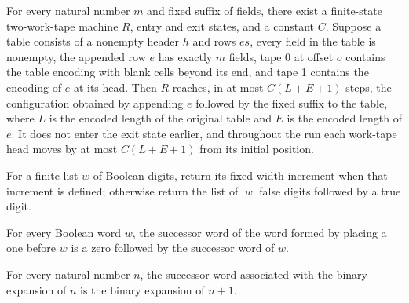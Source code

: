 \begin{theorem}
\label{Turing.exists_tableAppendTM}
\leanok
{}
For every natural number $m$ and fixed suffix of fields, there exist a finite-state
two-work-tape machine $R$, entry and exit states, and a constant $C$. Suppose a table
consists of a nonempty header $h$ and rows $es$, every field in the table is nonempty,
the appended row $e$ has exactly $m$ fields, tape 0 at offset $o$ contains the table
encoding with blank cells beyond its end, and tape 1 contains the encoding of $e$ at its
head. Then $R$ reaches, in at most $C(L+E+1)$ steps, the configuration obtained by
appending $e$ followed by the fixed suffix to the table, where $L$ is the encoded length
of the original table and $E$ is the encoded length of $e$. It does not enter the exit
state earlier, and throughout the run each work-tape head moves by at most $C(L+E+1)$
from its initial position.
\end{theorem}

\begin{definition}
\label{Turing.rt_succWord}
\leanok
{}
For a finite list $w$ of Boolean digits, return its fixed-width increment when that
increment is defined; otherwise return the list of $|w|$ false digits followed by a true
digit.
\end{definition}

\begin{theorem}
\label{Turing.rt_succWord_cons}
\leanok
{}
For every Boolean word $w$, the successor word of the word formed by placing a one
before $w$ is a zero followed by the successor word of $w$.
\end{theorem}

\begin{theorem}
\label{Turing.rt_succWord_bits}
\leanok
{}
For every natural number $n$, the successor word associated with the binary expansion of
$n$ is the binary expansion of $n+1$.
\end{theorem}

